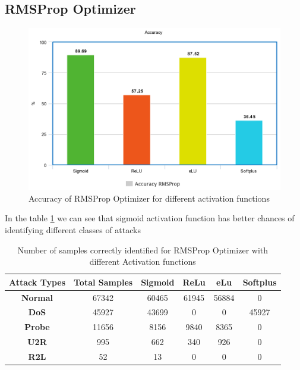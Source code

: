 \documentclass[12pt, a4paper]{report}
\begin{document}
\subsection {RMSProp Optimizer}
\begin{figure}[ht]
\centering
\captionsetup{justification=centering,margin=2cm}
\includegraphics[width=13cm]{accuracy_rmsprop_greedy.png}
\caption{ Accuracy of RMSProp Optimizer for different activation functions}
\label{fig:accuracy_rmsprop_greedy}
\end{figure}
In the table \ref{confusion_rmsprop} we can see that sigmoid activation function has better chances of identifying different classes of attacks
\begin{table}[ht]
\centering
\captionsetup{justification=centering,margin=2cm}
\begin{tabular}{|c|c|c|c|c|c|}
\hline
\textbf{Attack Types} & \textbf{Total Samples} & \textbf{Sigmoid} & \textbf{ReLu} & \textbf{eLu} & \textbf{Softplus} \\ \hline
\textbf{Normal}       & 67342                  & 60465                     & 61945         & 56884        & 0             \\ \hline
\textbf{DoS}          & 45927                  & 43699          		       & 0                  & 0         & 45927             \\ \hline
\textbf{Probe}        & 11656                  & 8156           		  & 9840         & 8365         & 0              \\ \hline
\textbf{U2R}          & 995                    & 662              		& 340           & 926          & 0               \\ \hline
\textbf{R2L}          & 52                     & 13               		& 0            & 0           & 0                \\ \hline
\end{tabular}
\caption{Number of samples correctly identified for RMSProp Optimizer with different Activation functions}
\label{confusion_rmsprop}
\end{table}
\clearpage
\end{document}
